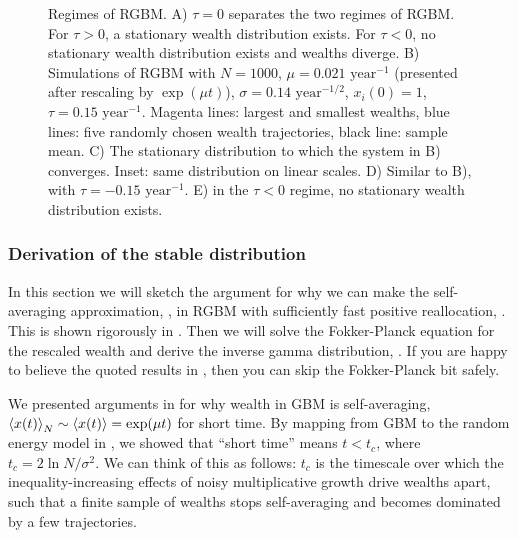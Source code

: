 \begin{figure}[!htb]
\caption{Regimes of RGBM. A) $\tau=0$ separates the two regimes of RGBM. For $\tau>0$, a stationary wealth distribution exists. For $\tau<0$, no stationary wealth distribution exists and wealths diverge. B) Simulations of RGBM with $N=1000$, $\mu=0.021 \text{ year}^{-1}$ (presented after rescaling by $\exp(\mu t)$), $\sigma=0.14\text{ year}^{-1/2}$, $x_i\left(0\right)=1$, $\tau=0.15 \text{ year}^{-1}$. Magenta lines: largest and smallest wealths, blue lines: five randomly chosen wealth trajectories, black line: sample mean. C) The stationary distribution to which the system in B) converges. Inset: same distribution on linear scales. D) Similar to B), with $\tau=-0.15 \text{ year}^{-1}$. E) in the $\tau<0$ regime, no stationary wealth distribution exists.}
\end{figure}


\subsubsection{Derivation of the stable distribution}
In this section we will sketch the argument for why we can make the self-averaging approximation, , in RGBM with sufficiently fast positive reallocation, . This is shown rigorously in \cite{Bouchaud2015b}. Then we will solve the Fokker-Planck equation for the rescaled wealth and derive the inverse gamma distribution, . If you are happy to believe the quoted results in , then you can skip the Fokker-Planck bit safely.

We presented arguments in  for why wealth in GBM is self-averaging, $\left\langle x(t) \right\rangle_N\sim\left\langle x(t) \right\rangle=\exp(\mu t)$ for short time. By mapping from GBM to the random energy model in , we showed that ``short time'' means $t<t_c$, where $t_c=2\ln N/\sigma^2$. We can think of this as follows: $t_c$ is the timescale over which the inequality-increasing effects of noisy multiplicative growth drive wealths apart, such that a finite sample of wealths stops self-averaging and becomes dominated by a few trajectories.

